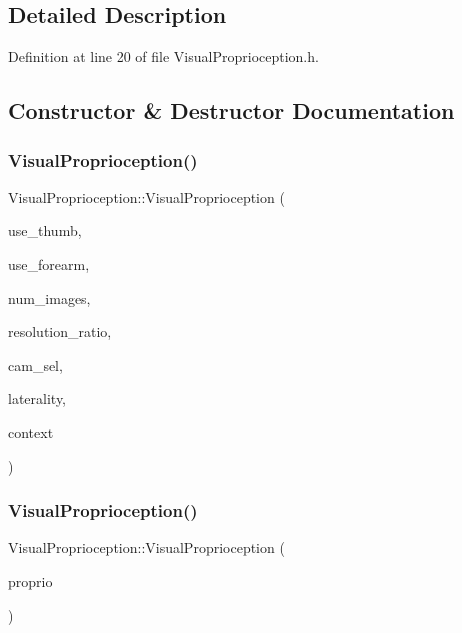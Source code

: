 \subsection{Detailed Description}


Definition at line 20 of file Visual\+Proprioception.\+h.



\subsection{Constructor \& Destructor Documentation}
\mbox{\label{classVisualProprioception_a46f58af24667f43811e214023ec00dcb}} 
\subsubsection{\texorpdfstring{Visual\+Proprioception()}{VisualProprioception()}\hspace{0.1cm}{\footnotesize\ttfamily [1/3]}}
{\footnotesize\ttfamily Visual\+Proprioception\+::\+Visual\+Proprioception (\begin{DoxyParamCaption}\item[{const bool}]{use\+\_\+thumb,  }\item[{const bool}]{use\+\_\+forearm,  }\item[{const int}]{num\+\_\+images,  }\item[{const double}]{resolution\+\_\+ratio,  }\item[{const yarp\+::os\+::\+Const\+String \&}]{cam\+\_\+sel,  }\item[{const yarp\+::os\+::\+Const\+String \&}]{laterality,  }\item[{const yarp\+::os\+::\+Const\+String \&}]{context }\end{DoxyParamCaption})}

\mbox{\label{classVisualProprioception_a25b2467569d795d63f806ffcdb9c2be4}} 
\subsubsection{\texorpdfstring{Visual\+Proprioception()}{VisualProprioception()}\hspace{0.1cm}{\footnotesize\ttfamily [2/3]}}
{\footnotesize\ttfamily Visual\+Proprioception\+::\+Visual\+Proprioception (\begin{DoxyParamCaption}\item[{const \hyperlink{classVisualProprioception}{Visual\+Proprioception} \&}]{proprio }\end{DoxyParamCaption})}



